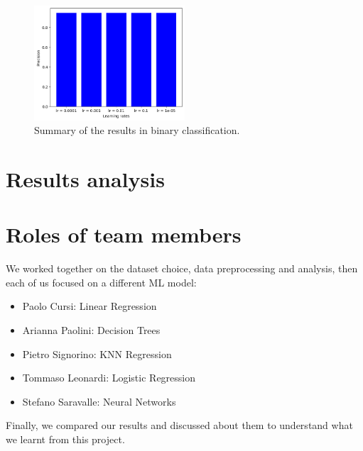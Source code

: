 \documentclass{article}
\begin{document}
\begin{figure}
    \centering
    \includegraphics[width=0.5\textwidth]{binary_results.png}
    \caption{\label{fig:binary_summary}Summary of the results in binary classification.}
\end{figure}

\section{Results analysis}
\section{Roles of team members}
We worked together on the dataset choice, data preprocessing and analysis, then each of us focused on a different ML model: 
\begin{itemize}
    \item Paolo Cursi: Linear Regression
    \item Arianna Paolini: Decision Trees
    \item Pietro Signorino: KNN Regression
    \item Tommaso Leonardi: Logistic Regression
    \item Stefano Saravalle: Neural Networks
\end{itemize}
Finally, we compared our results and discussed about them to understand what we learnt from this project.



\end{document}
